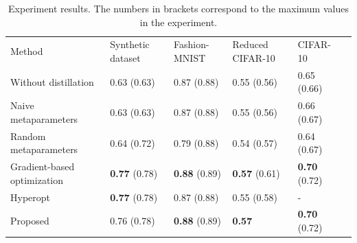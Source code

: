 \documentclass[runningheads]{llncs}
\begin{document}
\begin{table}[]

\caption{Experiment results. The numbers in brackets correspond to the maximum values in the experiment. }

\label{table:results}
\footnotesize
\centering
\begin{tabularx}{\textwidth}{|X|X|X|X|X|X}
\cline{1-5}
Method                      & Synthetic dataset & Fashion-MNIST & Reduced CIFAR-10 & CIFAR-10      &  \\ \cline{1-5}
Without distillation        & 0.63 (0.63)             & 0.87  (0.88)        & 0.55     (0.56)        & 0.65 (0.66)         &  \\ \cline{1-5}
Naive metaparameters        & 0.63  (0.63)              & 0.87 (0.88)         & 0.55  (0.56)             & 0.66  (0.67)        &  \\ \cline{1-5}
Random metaparameters       & 0.64   (0.72)           & 0.79   (0.88)       & 0.54 (0.57)             & 0.64 (0.67)        &  \\ \cline{1-5}
Gradient-based optimization & \textbf{0.77} (0.78)    & \textbf{0.88} (0.89) & \textbf{0.57} (0.61)    & \textbf{0.70} (0.72) &  \\ \cline{1-5}
Hyperopt                    & \textbf{0.77} (0.78)                & 0.87 (0.88)         & 0.55  (0.58)           & -             &  \\ \cline{1-5}
Proposed                    & 0.76   (0.78)           & \textbf{0.88} (0.89) & \textbf{0.57}    & \textbf{0.70} (0.72) &  \\ \cline{1-5}
\end{tabularx}
\end{table}
\end{document}
